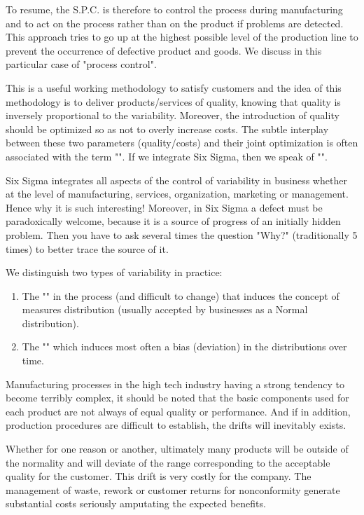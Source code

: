 To resume, the S.P.C. is therefore to control the process during manufacturing and to act on the process rather than on the product if problems are detected. This approach tries to go up at the highest possible level of the production line to prevent the occurrence of defective product and goods. We discuss in this particular case of "process control".

This is a useful working methodology to satisfy customers and the idea of this methodology is to deliver products/services of quality, knowing that quality is inversely proportional to the variability. Moreover, the introduction of quality should be optimized so as not to overly increase costs. The subtle interplay between these two parameters (quality/costs) and their joint optimization is often associated with the term "". If we integrate Six Sigma, then we speak of "".

Six Sigma integrates all aspects of the control of variability in business whether at the level of manufacturing, services, organization, marketing or management. Hence why it is such interesting! Moreover, in Six Sigma a defect must be paradoxically welcome, because it is a source of progress of an initially hidden problem. Then you have to ask several times the question "Why?" (traditionally 5 times) to better trace the source of it.

We distinguish two types of variability in practice:
\begin{enumerate}
	\item The "" in the process (and difficult to change) that induces the concept of measures distribution (usually accepted by businesses as a Normal distribution).
	\item The "" which induces most often a bias (deviation) in the distributions over time.
\end{enumerate}
Manufacturing processes in the high tech industry having a strong tendency to become terribly complex, it should be noted that the basic components used for each product are not always of equal quality or performance. And if in addition, production procedures are difficult to establish, the drifts will inevitably exists.

Whether for one reason or another, ultimately many products will be outside of the normality and will deviate of the range corresponding to the acceptable quality for the customer. This drift is very costly for the company. The management of waste, rework or customer returns for nonconformity generate substantial costs seriously amputating the expected benefits.

